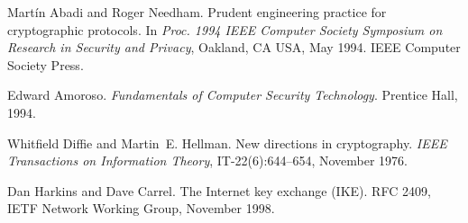 \documentclass[a4paper,12pt]{article}
\begin{document}
\begin{thebibliography}{1}
\label{Bibliography}

Mart\'in Abadi and Roger Needham.
\newblock Prudent engineering practice for cryptographic protocols.
\newblock In \textit{Proc. 1994 IEEE Computer Society Symposium on Research 
  in Security and Privacy}, Oakland, CA USA, May 1994. IEEE Computer Society
  Press.

Edward Amoroso.
\newblock \textit{Fundamentals of Computer Security Technology}.
\newblock Prentice Hall, 1994.

Whitfield Diffie and Martin~E. Hellman.
\newblock New directions in cryptography.
\newblock \textit{IEEE Transactions on Information Theory}, IT-22(6):644--654,
  November 1976.

Dan Harkins and Dave Carrel.
\newblock The Internet key exchange (IKE).
\newblock RFC 2409, IETF Network Working Group, November 1998.

\end{thebibliography}


%
% 
%
%
\end{document}
